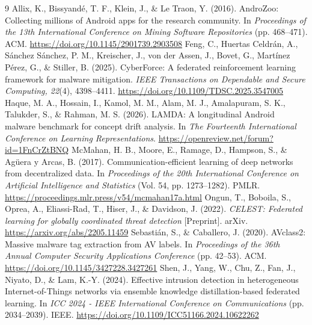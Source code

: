 \documentclass[11pt,a4paper]{article}
\begin{document}
\newpage
{\small
\begin{thebibliography}{9}
\setlength{\itemsep}{0.25em}
 Allix, K., Bissyand\'e, T. F., Klein, J., \& Le Traon, Y. (2016). AndroZoo: Collecting millions of Android apps for the research community. In \emph{Proceedings of the 13th International Conference on Mining Software Repositories} (pp. 468--471). ACM. \url{https://doi.org/10.1145/2901739.2903508}
 Feng, C., Huertas Celdr\'an, A., S\'anchez S\'anchez, P. M., Kreischer, J., von der Assen, J., Bovet, G., Mart\'inez P\'erez, G., \& Stiller, B. (2025). CyberForce: A federated reinforcement learning framework for malware mitigation. \emph{IEEE Transactions on Dependable and Secure Computing, 22}(4), 4398--4411. \url{https://doi.org/10.1109/TDSC.2025.3547005}
 Haque, M. A., Hossain, I., Kamol, M. M., Alam, M. J., Amalapuram, S. K., Talukder, S., \& Rahman, M. S. (2026). LAMDA: A longitudinal Android malware benchmark for concept drift analysis. In \emph{The Fourteenth International Conference on Learning Representations}. \url{https://openreview.net/forum?id=1FnCrZtBNQ}
 McMahan, H. B., Moore, E., Ramage, D., Hampson, S., \& Ag\"uera y Arcas, B. (2017). Communication-efficient learning of deep networks from decentralized data. In \emph{Proceedings of the 20th International Conference on Artificial Intelligence and Statistics} (Vol. 54, pp. 1273--1282). PMLR. \url{https://proceedings.mlr.press/v54/mcmahan17a.html}
 Ongun, T., Boboila, S., Oprea, A., Eliassi-Rad, T., Hiser, J., \& Davidson, J. (2022). \emph{CELEST: Federated learning for globally coordinated threat detection} [Preprint]. arXiv. \url{https://arxiv.org/abs/2205.11459}
 Sebasti\'an, S., \& Caballero, J. (2020). AVclass2: Massive malware tag extraction from AV labels. In \emph{Proceedings of the 36th Annual Computer Security Applications Conference} (pp. 42--53). ACM. \url{https://doi.org/10.1145/3427228.3427261}
 Shen, J., Yang, W., Chu, Z., Fan, J., Niyato, D., \& Lam, K.-Y. (2024). Effective intrusion detection in heterogeneous Internet-of-Things networks via ensemble knowledge distillation-based federated learning. In \emph{ICC 2024 - IEEE International Conference on Communications} (pp. 2034--2039). IEEE. \url{https://doi.org/10.1109/ICC51166.2024.10622262}
\end{thebibliography}
}
\end{document}
